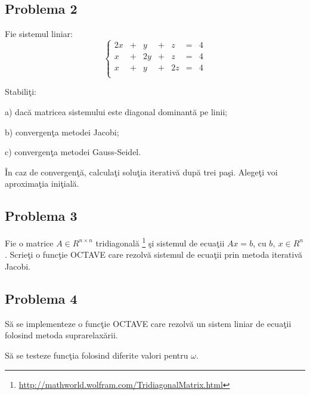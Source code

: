 \documentclass{exam}
\theoremstyle{definition}
\newcommand{\octavescript}[2]{
	
}
\begin{document}


\subsection{Problema 2}
Fie sistemul liniar:
$$	\left\{
	\begin{array}{ccccccc}
		2x & + & y  & + & z  & = & 4 \\
		x  & + & 2y & + & z  & = & 4 \\
		x  & + & y  & + & 2z & = & 4 \\
	\end{array} \right.
$$

Stabili\c{t}i:

a) dac\u{a} matricea sistemului este diagonal dominant\u{a} pe linii;

b) convergen\c{t}a metodei Jacobi;

c) convergen\c{t}a metodei Gauss-Seidel.

\^{I}n caz de convergen\c{t}\u{a}, calcula\c{t}i solu\c{t}ia iterativ\u{a} dup\u{a} trei pa\c{s}i. Alege\c{t}i voi aproxima\c{t}ia ini\c{t}ial\u{a}.


\subsection{Problema 3}
Fie o matrice $A \in R^{n\times n}$ tridiagonal\u{a} \footnote{\url{http://mathworld.wolfram.com/TridiagonalMatrix.html}} \c{s}i sistemul de ecua\c{t}ii $Ax=b$, cu $b,\ x \in R^{n}$. Scrie\c{t}i o func\c{t}ie OCTAVE care rezolv\u{a} sistemul de ecua\c{t}ii prin metoda iterativ\u{a} Jacobi.

\octavescript{./src/Jacobi.m}{Algoritmul Jacobi}

\subsection{Problema 4}
S\u{a} se implementeze o func\c{t}ie OCTAVE care rezolv\u{a} un sistem liniar de ecua\c{t}ii folosind metoda suprarelax\u{a}rii.
\octavescript{./src/sor.m}{Suprarelaxare}

S\u{a} se testeze func\c{t}ia folosind diferite valori pentru $\omega$.



\end{document}
